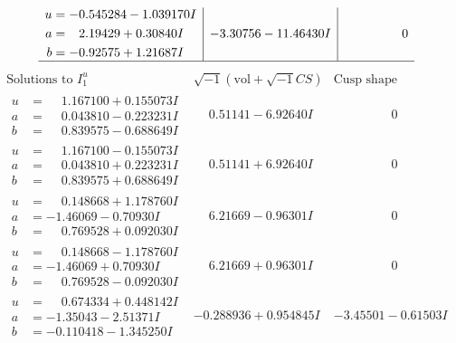 \documentclass[1p]{elsarticle_modified}
\theoremstyle{definition}
\newcommand{\I}{\sqrt{-1}}
\begin{document}
$$\begin{array}{c|c|c}
\begin{aligned}
u &= -0.545284 - 1.039170 I \\
a &= \phantom{-}2.19429 + 0.30840 I \\
b &= -0.92575 + 1.21687 I\end{aligned}
 & -3.30756 - 11.46430 I & \phantom{-0.000000 } 0\\
 \hline 
 \end{array}$$\newpage$$\begin{array}{c|c|c}  
\text{Solutions to }I^u_{1}& \I (\text{vol} + \sqrt{-1}CS) & \text{Cusp shape}\\
 \hline 
\begin{aligned}
u &= \phantom{-}1.167100 + 0.155073 I \\
a &= \phantom{-}0.043810 - 0.223231 I \\
b &= \phantom{-}0.839575 - 0.688649 I\end{aligned}
 & \phantom{-}0.51141 - 6.92640 I & \phantom{-0.000000 } 0 \\ \hline\begin{aligned}
u &= \phantom{-}1.167100 - 0.155073 I \\
a &= \phantom{-}0.043810 + 0.223231 I \\
b &= \phantom{-}0.839575 + 0.688649 I\end{aligned}
 & \phantom{-}0.51141 + 6.92640 I & \phantom{-0.000000 } 0 \\ \hline\begin{aligned}
u &= \phantom{-}0.148668 + 1.178760 I \\
a &= -1.46069 - 0.70930 I \\
b &= \phantom{-}0.769528 + 0.092030 I\end{aligned}
 & \phantom{-}6.21669 - 0.96301 I & \phantom{-0.000000 } 0 \\ \hline\begin{aligned}
u &= \phantom{-}0.148668 - 1.178760 I \\
a &= -1.46069 + 0.70930 I \\
b &= \phantom{-}0.769528 - 0.092030 I\end{aligned}
 & \phantom{-}6.21669 + 0.96301 I & \phantom{-0.000000 } 0 \\ \hline\begin{aligned}
u &= \phantom{-}0.674334 + 0.448142 I \\
a &= -1.35043 - 2.51371 I \\
b &= -0.110418 - 1.345250 I\end{aligned}
 & -0.288936 + 0.954845 I & -3.45501 - 0.61503 I \\ \hline\begin{aligned}

\end{aligned}
\end{array}$$
\end{document}
